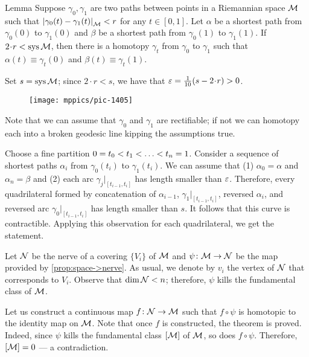 \begin{thm}{Lemma}\label{lem:sys-homotopy}
Suppose $\gamma_0,\gamma_1$ are two paths between points in a Riemannian space $\mathcal{M}$ such that $\dist{\gamma_0(t)}{\gamma_1(t)}{\spc{M}}<r$ for any $t\in[0,1]$.
Let $\alpha$ be a shortest path from $\gamma_0(0)$ to $\gamma_1(0)$ and $\beta$ be a shortest path from $\gamma_0(1)$ to $\gamma_1(1)$. 
If $2\cdot r<\sys\spc{M}$, then there is a homotopy $\gamma_t$ from
$\gamma_0$ to $\gamma_1$ such that $\alpha(t)\equiv \gamma_t(0)$ and $\beta(t)\equiv \gamma_t(1)$.
\end{thm}

Set $s=\mathop{\rm sys}\nolimits\mathcal{M}$; 
since $2\cdot r<s$, we have that $\eps=\tfrac1{10}(s-2\cdot r)>0$.

\begin{wrapfigure}{o}{34mm}
\vskip-0mm
\centering
\texttt{[image: mppics/pic-1405]}
\end{wrapfigure}

Note that we can assume that $\gamma_0$ and $\gamma_1$ are rectifiable;
if not we can homotopy each into a broken geodesic line kipping the assumptions true. 

Choose a fine partition $0\z=t_0\z<t_1\z<\z\dots\z<t_n=1$.
Consider a sequence of shortest paths $\alpha_i$ from $\gamma_0(t_i)$ to $\gamma_1(t_i)$.
We can assume that (1) $\alpha_0=\alpha$ and $\alpha_n=\beta$ and (2) each arc $\gamma_j|_{[t_{i-1},t_i]}$ has length smaller than $\varepsilon$.
Therefore, every quadrilateral formed by concatenation  of $\alpha_{i-1}$, $\gamma_1|_{[t_{i-1},t_i]}$, reversed $\alpha_i$, and reversed arc $\gamma_0|_{[t_{i-1},t_i]}$ has length smaller than $s$.
It follows that this curve is contractible.
Applying this observation for each quadrilateral, we get the statement.
\qeds


Let $\mathcal{N}$ be the nerve of a covering $\{V_i\}$ of $\mathcal{M}$ and $\psi\colon\mathcal{M}\to\mathcal{N}$ be the map provided by \ref{prop:space->nerve}.
As usual, we denote by $v_i$ the vertex of $\mathcal{N}$ that corresponds to $V_i$.
Observe that $\operatorname{\rm dim}\nolimits\mathcal{N}<n$;
therefore, $\psi$ kills the fundamental class of $\mathcal{M}$.

Let us construct a continuous map  $f\colon\mathcal{N}\to  \mathcal{M}$ such that
$f\circ\psi$ is homotopic to the identity map on $\mathcal{M}$.
Note that once $f$ is constructed, the theorem is proved.
Indeed, since $\psi$ kills the fundamental class $[\mathcal{M}]$ of $\mathcal{M}$, so does $f\circ\psi$.
Therefore, $[\mathcal{M}]=0$ --- a contradiction.

